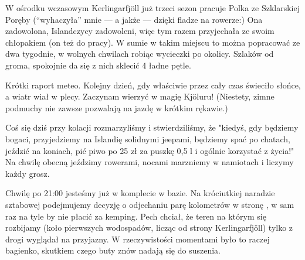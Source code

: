 W ośrodku wczasowym Kerlingarfjöll już trzeci sezon pracuje Polka ze Szklarskiej Poręby (“wyhaczyła” mnie --- a jakże --- dzięki fladze na rowerze:) Ona zadowolona, Islandczycy zadowoleni, więc tym razem przyjechała ze swoim chłopakiem (on też do pracy). W sumie w takim miejscu to można popracować ze dwa tygodnie, w wolnych chwilach robiąc wycieczki po okolicy. Szlaków od groma, spokojnie da się z nich sklecić 4 ładne pętle.


Krótki raport meteo. Kolejny dzień, gdy właściwie przez cały czas świeciło słońce, a wiatr wiał w plecy. Zaczynam wierzyć w magię Kjöluru! (Niestety, zimne podmuchy nie zawsze pozwalają na jazdę w krótkim rękawie.)

Coś się dziś przy kolacji rozmarzyliśmy i stwierdziliśmy, że "kiedyś, gdy będziemy bogaci, przyjedziemy na Islandię solidnymi jeepami, będziemy spać po chatach, jeździć na koniach, pić piwo po 25 zł za puszkę 0,5 l i ogólnie korzystać z życia!" Na chwilę obecną jeździmy rowerami, nocami marzniemy w namiotach i liczymy każdy grosz.

Chwilę po 21:00 jesteśmy już w komplecie w bazie. Na króciutkiej naradzie sztabowej podejmujemy decyzję o odjechaniu parę kolometrów w stronę , w sam raz na tyle by nie płacić za kemping. Pech chciał, że teren na którym się rozbijamy (koło pierwszych wodospadów, licząc od strony Kerlingarfjöll) tylko z drogi wyglądał na przyjazny. W rzeczywistości momentami było to raczej bagienko, skutkiem czego buty znów nadają się do suszenia.

